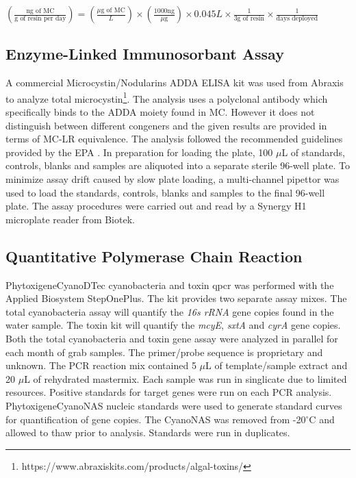 \begin {center} 
$(\frac{\text{ng of MC}}{\text{g of resin per day}}) =(\frac{\text{$\mu$g of MC}}{L}) \times (\frac{\text{1000ng}}{\text{$\mu$g}}) \times {0.045L} \times \frac{1}{\text{3g of resin}} \times \frac{1}{\text{days deployed}}$
\end{center}



\subsection{Enzyme-Linked Immunosorbant Assay}

A commercial Microcystin/Nodularins ADDA ELISA kit was used from Abraxis to analyze total microcystin\footnote{https://www.abraxiskits.com/products/algal-toxins/}. The analysis uses a polyclonal antibody which specifically binds to the ADDA moiety found in MC. However it does not distinguish between different congeners and the given results are provided in terms of MC-LR equivalence. The analysis followed the recommended guidelines provided by the EPA \cite{usepa_method_2016}. In preparation for loading the plate,  100 $\mu$L of standards, controls, blanks and samples are aliquoted into a separate sterile 96-well plate. To minimize assay drift caused by slow plate loading, a multi-channel pipettor was used to load the standards, controls, blanks and samples to the final 96-well plate. The assay procedures were carried out and read by a Synergy H1 microplate reader from Biotek.

\subsection{Quantitative Polymerase Chain Reaction}

Phytoxigene\texttrademark  CyanoDTec cyanobacteria and toxin \gls{qpcr} was performed with the Applied Biosystem StepOnePlus\texttrademark. The kit provides two separate assay mixes. The total cyanobacteria assay will quantify the \emph{16s rRNA} gene copies found in the water sample. The toxin kit will quantify the \emph{mcyE}, \emph{sxtA} and \emph{cyrA} gene copies.  Both the total cyanobacteria and toxin gene assay were analyzed in parallel for each month of grab samples. The primer/probe sequence is proprietary and unknown.  The PCR reaction mix contained 5 $\mu$L of template/sample extract and 20 $\mu$L of rehydrated mastermix.  Each sample was run in singlicate due to limited resources. Positive standards for target genes  were run on each PCR analysis. Phytoxigene\texttrademark  CyanoNAS nucleic standards were used to generate standard curves for quantification of gene copies. The CyanoNAS was removed from -20$^\circ$C and allowed to thaw prior to analysis.  Standards were run in duplicates.

